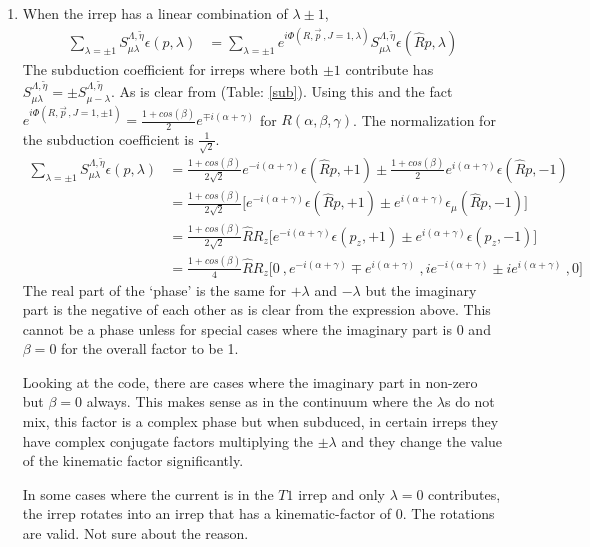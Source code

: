 \documentclass[10pt]{article}
\begin{document}
\begin{enumerate}
	\item When the irrep has a linear combination of $\lambda \pm 1$,
\begin{align*}
\sum_{\lambda = \pm 1} S^{ \Lambda,\tilde{\eta}  }_{\mu \lambda} \epsilon(p , \lambda) 
&= \sum_{\lambda = \pm 1} e^{i \Phi(R, \vec{p}\, , J = 1, \lambda)} S^{ \Lambda,\tilde{\eta}  }_{\mu \lambda} \epsilon(\hat{R}p , \lambda)
\end{align*}
The subduction coefficient for irreps where both $\pm 1$ contribute has $S^{ \Lambda,\tilde{\eta}  }_{\mu \lambda} = \pm S^{ \Lambda,\tilde{\eta}  }_{\mu -\lambda}$. As is clear from (Table: \ref{sub}). Using this and the fact $e^{i \Phi(R, \vec{p}\, , J = 1, \pm 1)} = \frac{1 + cos(\beta)}{2}e^{\mp i(\alpha + \gamma)}$ for $R(\alpha,\beta,\gamma)$. The normalization for the subduction coefficient is $\frac{1}{\sqrt{2}}$.
\begin{align*}
\sum_{\lambda = \pm 1} S^{ \Lambda,\tilde{\eta}  }_{\mu \lambda} \epsilon(p , \lambda) 
&= \frac{1 + cos(\beta)}{2\sqrt{2}}e^{- i(\alpha + \gamma)}\epsilon(\hat{R}p , +1) \pm \frac{1 + cos(\beta)}{2}e^{ i(\alpha + \gamma)}\epsilon(\hat{R}p , -1)\\
&= \frac{1 + cos(\beta)}{2\sqrt{2}}\Big[ e^{- i(\alpha + \gamma)}\epsilon(\hat{R}p , +1) \pm e^{ i(\alpha + \gamma)}\epsilon_{\mu}(\hat{R}p , -1) \Big]\\
&= \frac{1 + cos(\beta)}{2\sqrt{2}}\hat{R}R_{z} \Big[ e^{- i(\alpha + \gamma)}\epsilon(p_z , +1) \pm e^{ i(\alpha + \gamma)}\epsilon(p_z , -1) \Big]\\
&= \frac{1 + cos(\beta)}{4}\hat{R}R_{z} \Big[ 0\ , e^{- i(\alpha + \gamma)} \mp e^{ i(\alpha + \gamma)}\ , ie^{- i(\alpha + \gamma)} \pm ie^{ i(\alpha + \gamma)}\ ,0 \Big]
\end{align*}
The real part of the `phase' is the same for $+\lambda$ and $-\lambda$ but the imaginary part is the negative of each other as is clear from the expression above. This cannot be a  {\color{red}phase} unless for special cases where the imaginary part is 0 and $\beta = 0$ for the overall factor to be 1. \par
Looking at the code, there are cases where the imaginary part in non-zero but $\beta = 0$ always. This makes sense as in the continuum where the $\lambda$s do not mix, this factor is a complex phase but when subduced, in certain irreps they have complex conjugate factors multiplying the $\pm \lambda$ and they change the value of the kinematic factor significantly. \par
In some cases where the current is in the $T1$ irrep and only $\lambda = 0$ contributes, the irrep rotates into an irrep that has a kinematic-factor of 0. The rotations are valid. Not sure about the reason.
\end{enumerate}
\end{document}
